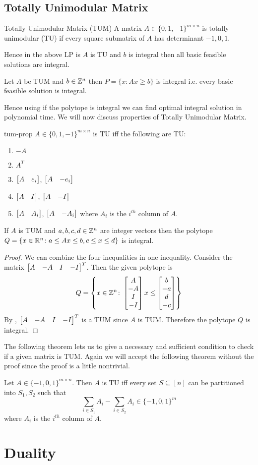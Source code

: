 \subsection{Totally Unimodular Matrix}
\begin{Definition}{Totally Unimodular Matrix (TUM)}{}
	A matrix $A\in \{0,1,-1\}^{m\times n}$ is totally unimodular (TU) if every square submatrix of $A$ has determinant $-1,0,1$.
\end{Definition}Hence in the above LP is $A$ is TU and $b$ is integral then all basic feasible solutions are integral.
\begin{lemma}{}{}
	Let $A$ be TUM and $b\in \mathbb{Z}^n$ then $P=\{x\colon Ax\geq b\}$ is integral i.e. every basic feasible solution is integral.
\end{lemma}

Hence using  if the polytope is integral we can find optimal integral solution in polynomial time. We will now discuss properties of Totally Unimodular Matrix.
\begin{lemma}{}{tum-prop}
	$A\in \{0,1,-1\}^{m\times n}$ is TU iff the following are TU:
	\begin{enumerate}[label=(\roman*)]
		\item $-A$
		\item $A^T$
		\item $\left[\begin{matrix}A & e_i\end{matrix}\right]$, $\left[\begin{matrix}A & -e_i\end{matrix}\right]$
		\item $\left[\begin{matrix}A& I\end{matrix}\right]$, $\left[\begin{matrix}A & -I\end{matrix}\right]$
		\item $\left[\begin{matrix}A & A_i\end{matrix}\right]$, $\left[\begin{matrix}A & -A_i\end{matrix}\right]$ where $A_i$ is the $i^{th}$ column of $A$. 
	\end{enumerate}
\end{lemma}


\begin{corolary}{}{}
	If $A$ is TUM and $a,b,c,d\in\mathbb{Z}^n$ are integer vectors then the polytope $Q=\{x\in \mathbb{R}^n\colon a\leq Ax\leq b, c\leq x\leq d\}$ is integral.
\end{corolary}
\begin{proof}
	We can combine the four inequalities in one inequality. Consider the matrix $\left[\begin{matrix}A & -A & I & -I\end{matrix}\right]^T$. Then the given polytope is $$Q=\left\{x\in\mathbb{Z}^n\colon \left[\begin{matrix}A \\ -A \\ I \\ -I\end{matrix}\right] x\leq \left[\begin{matrix}b \\-a\\ d \\ -c\end{matrix}\right]\right\}$$By , $\left[\begin{matrix}A & -A & I & -I\end{matrix}\right]^T$ is a TUM since $A$ is TUM. Therefore the polytope $Q$ is integral.
\end{proof}
The following theorem lets us to give a necessary and sufficient condition to check if a given matrix is TUM. Again we will accept the following theorem without the proof since the proof is a little nontrivial.
\begin{Theorem}{}{}
	Let $A\in\{-1,0,1\}^{m\times n}$. Then $A$ is TU iff every set $S\subseteq [n]$ can be partitioned into $S_1, S_2$ such that $$\sum_{i\in S_1}A_i-\sum_{i\in S_2}A_i\in \{-1,0,1\}^m$$where $A_i$ is the $i^{th}$ column of $A$. 
\end{Theorem}
\section{Duality}